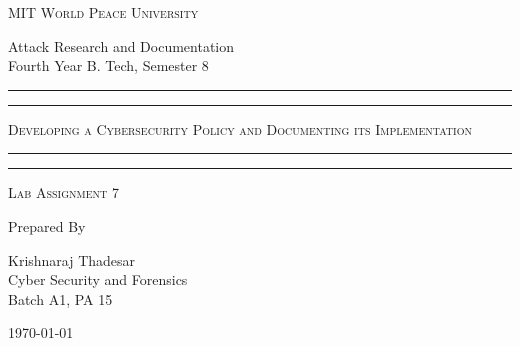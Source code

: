 \documentclass[11pt]{article}
\begin{document}
\begin{titlepage}
	\centering


	\huge\textsc{
		MIT World Peace University
	}\\

	\vspace{0.75\baselineskip} %

	\LARGE{
		Attack Research and Documentation\\
		Fourth Year B. Tech, Semester 8
	}

	\vfill %


	\rule{\textwidth}{1.6pt}\vspace*{-\baselineskip}\vspace*{2pt}
	\rule{\textwidth}{0.6pt}
	\vspace{0.75\baselineskip} %

	\huge{\textsc{
        Developing a Cybersecurity Policy and Documenting its Implementation
    }} \\

	\vspace{0.5\baselineskip} %
	\rule{\textwidth}{0.6pt}\vspace*{-\baselineskip}\vspace*{2.8pt}
	\rule{\textwidth}{1.6pt}

	\vspace{1\baselineskip} %


	\LARGE\textsc{
		Lab Assignment 7
	} %
	\vfill


	Prepared By \vspace{0.5\baselineskip} %

	\Large{
		Krishnaraj Thadesar \\
		Cyber Security and Forensics\\
        Batch A1, PA 15
	}

	\vspace{0.5\baselineskip} %
	\today

\end{titlepage}
\end{document}
